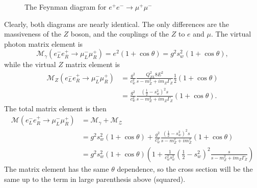 \documentclass[12pt]{article}
\begin{document}
\begin{enumerate}[label=(\alph*)]
\begin{figure}[h]
{
        }
        \caption{The Feynman diagram for $e^+e^- \to \mu^+\mu^-$}
        \label{fig1}
    \end{figure}
    Clearly, both diagrams are nearly identical. The only differences are the massiveness of the $Z$ boson, and the couplings of the $Z$ to $e$ and $\mu$. The virtual photon matrix element is 
    \[ \mathcal{M}_\gamma(e_L^-e_R^+\to\mu_L^-\mu_R^+) = e^2(1 + \cos\theta) = g^2s_w^2(1 + \cos\theta), \]
    while the virtual $Z$ matrix element is
    \begin{align*}
        \mathcal{M}_Z(e_L^-e_R^+\to\mu_L^-\mu_R^+) &= \frac{g^2}{c_w^2}\frac{Q_{ZL}^2 8E^2}{s - m_Z^2 + im_Z\Gamma_Z} \frac{1}{2}(1 + \cos\theta) \\
        &= \frac{g^2}{c_w^2}\frac{(\frac{1}{2} - s_w^2)^2 s}{s - m_Z^2 + im_Z\Gamma_Z}(1 + \cos\theta).
    \end{align*}
    The total matrix element is then
    \begin{align*}
        \mathcal{M}(e_L^-e_R^+\to\mu_L^-\mu_R^+) &= \mathcal{M_\gamma} + \mathcal{M_Z} \\
        &= g^2s_w^2(1 + \cos\theta) + \frac{g^2}{c_w^2}\frac{(\frac{1}{2} - s_w^2)^2 s}{s - m_Z^2 + im_Z^2}(1 + \cos\theta) \\
        &= g^2s_w^2(1 + \cos\theta)\left(1 + \frac{1}{c_w^2s_w^2}(\frac{1}{2}-s_w^2)^2\frac{s}{s-m_Z^2+im_Z\Gamma_Z}\right)
    \end{align*}
    The matrix element has the same $\theta$ dependence, so the cross section will be the same up to the term in large parenthesis above (squared).

\end{enumerate}
\end{document}
